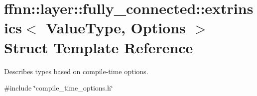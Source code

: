 \hypertarget{structffnn_1_1layer_1_1fully__connected_1_1extrinsics}{\section{ffnn\-:\-:layer\-:\-:fully\-\_\-connected\-:\-:extrinsics$<$ Value\-Type, Options $>$ Struct Template Reference}
\label{structffnn_1_1layer_1_1fully__connected_1_1extrinsics}
}


Describes types based on compile-\/time options.  




{\ttfamily \#include \char`\"{}compile\-\_\-time\-\_\-options.\-h\char`\"{}}

